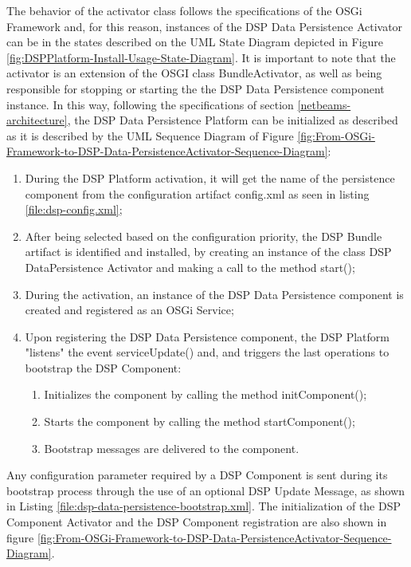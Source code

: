 The behavior of the activator class follows the specifications of the
OSGi Framework and, for this reason, instances of the DSP Data Persistence
Activator can be in the states described on the UML State Diagram depicted in
Figure \ref{fig:DSPPlatform-Install-Usage-State-Diagram}. It is important to
note that the activator is an extension of the OSGI class BundleActivator, as
well as being responsible for stopping or starting the the DSP Data Persistence
component instance. In this way, following the specifications of section
\ref{netbeams-architecture}, the DSP Data Persistence Platform can be
initialized as described as it is described by the UML Sequence Diagram of
Figure
\ref{fig:From-OSGi-Framework-to-DSP-Data-PersistenceActivator-Sequence-Diagram}:

\begin{enumerate}
  \item During the DSP Platform activation, it will get the name of the
  persistence component from the configuration artifact config.xml as seen in
  listing \ref{file:dsp-config.xml};
  \item After being selected based on the configuration priority, the DSP
  Bundle artifact is identified and installed, by creating an instance of the
  class DSP DataPersistence Activator and making a call to the method start();
  \item During the activation, an instance of the DSP Data Persistence
  component is created and registered as an OSGi Service;
  \item Upon registering the DSP Data Persistence component, the DSP Platform
  "listens" the event serviceUpdate() and, and triggers the last operations to
  bootstrap the DSP Component:
   \begin{enumerate}
      \item Initializes the component by calling the method initComponent();
      \item Starts the component by calling the method startComponent();
      \item Bootstrap messages are delivered to the component.
   \end{enumerate}
\end{enumerate}

Any configuration parameter required by a DSP Component is sent during its
bootstrap process through the use of an optional DSP Update Message, as shown
in Listing \ref{file:dsp-data-persistence-bootstrap.xml}. The initialization of
the DSP Component Activator and the DSP Component registration are also shown
in figure \ref{fig:From-OSGi-Framework-to-DSP-Data-PersistenceActivator-Sequence-Diagram}.

